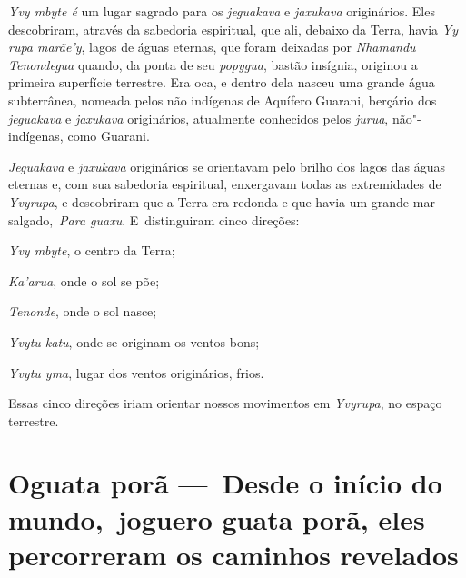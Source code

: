  

 


 

\emph{Yvy mbyte é} um lugar sagrado para os \emph{jeguakava} e
\emph{jaxukava} originários. Eles descobriram, através da sabedoria
espiritual, que ali, debaixo da Terra, havia \emph{Yy rupa marãe'y},
lagos de águas eternas, que foram deixadas por \emph{Nhamandu
Tenondegua} quando, da ponta de seu \emph{popygua}, bastão insígnia,
originou a primeira superfície terrestre. Era oca, e dentro dela nasceu
uma grande água subterrânea, nomeada pelos não indígenas de Aquífero
Guarani, berçário dos \emph{jeguakava} e \emph{jaxukava} originários,
atualmente conhecidos pelos \emph{jurua}, não"-indígenas, como Guarani.

\emph{Jeguakava} e \emph{jaxukava} originários se orientavam pelo brilho
dos lagos das águas eternas e, com sua sabedoria espiritual, enxergavam
todas as extremidades de \emph{Yvyrupa}, e descobriram que a Terra era
redonda e que havia um grande mar salgado,~\emph{Para guaxu}. E~distinguiram cinco direções:

\emph{Yvy mbyte}, o centro da Terra;

\emph{Ka'arua}, onde o sol se põe;

\emph{Tenonde}, onde o sol nasce;

\emph{Yvytu katu}, onde se originam os ventos bons;

\emph{Yvytu yma}, lugar dos ventos originários, frios.

Essas cinco direções iriam orientar nossos movimentos em \emph{Yvyrupa},
no espaço terrestre.

 

\part[Desde o início do mundo]{Oguata porã — Desde o início do mundo, joguero guata porã, eles percorreram os caminhos revelados}  
